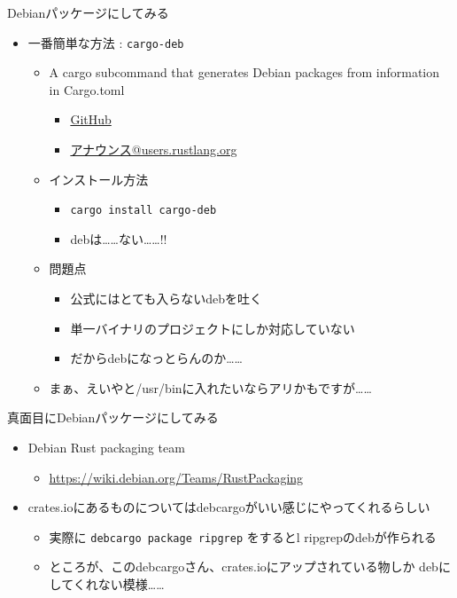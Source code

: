 \documentclass[cjk,dvipdfmx,10pt,compress,fragile%
hyperref={bookmarks=true,bookmarksnumbered=true,bookmarksopen=false,%
colorlinks=false,%
pdftitle={第 134 回 関西 Debian 勉強会},%
pdfauthor={小林},%
pdfsubject={資料},%
}]{beamer}
\begin{document}

\begin{frame}[t,fragile]{Debianパッケージにしてみる}
 \begin{itemize}
  \item 一番簡単な方法 : \texttt{cargo-deb}
	\begin{itemize}
	 \item A cargo subcommand that generates Debian packages from information in Cargo.toml
	       \begin{itemize}
		\item \href{https://github.com/mmstick/cargo-deb}{GitHub}
		\item \href{https://users.rust-lang.org/t/cargo-deb-make-debian-packages-from-cargo-projects/12199}{アナウンス@users.rustlang.org}
	       \end{itemize}
	 \item インストール方法
	       \begin{itemize}
		\item \verb|cargo install cargo-deb|
		\item debは……ない……!!
	       \end{itemize}
	 \item 問題点
	       \begin{itemize}
		\item 公式にはとても入らないdebを吐く
		\item 単一バイナリのプロジェクトにしか対応していない
		\item だからdebになっとらんのか……
	       \end{itemize}
	 \item まぁ、えいやと/usr/binに入れたいならアリかもですが……
	\end{itemize}
 \end{itemize}
\end{frame}

\begin{frame}[t,fragile]{真面目にDebianパッケージにしてみる}
 \begin{itemize}
  \item Debian Rust packaging team
	\begin{itemize}
	 \item \url{https://wiki.debian.org/Teams/RustPackaging}
	\end{itemize}
  \item crates.ioにあるものについてはdebcargoがいい感じにやってくれるらしい
	\begin{itemize}
	 \item 実際に \verb|debcargo package ripgrep| をするとl
	       ripgrepのdebが作られる
	 \item ところが、このdebcargoさん、crates.ioにアップされている物しか
	       debにしてくれない模様……
	\end{itemize}
 \end{itemize}
\end{frame}
\end{document}
